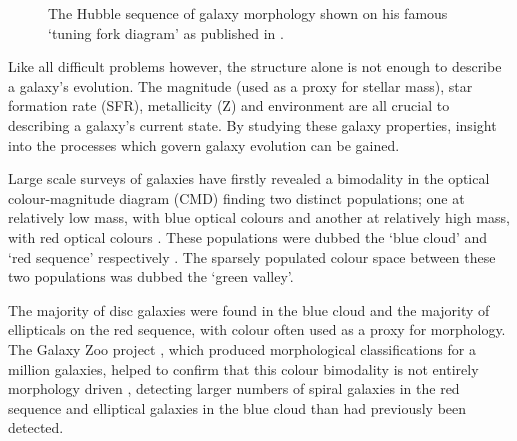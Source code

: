 \begin{figure}
\caption[The Hubble sequence for morphological classification of galaxies]{The Hubble sequence of galaxy morphology shown on his famous `tuning fork diagram' as published in \cite{hubble36}.}
\label{fig:hubble}
\end{figure}

Like all difficult problems however, the structure alone is not enough to describe a galaxy's evolution. The magnitude (used as a proxy for stellar mass), star formation rate (SFR), metallicity (Z) and environment are all crucial to describing a galaxy's current state. By studying these galaxy properties, insight into the processes which govern galaxy evolution can be gained.

Large scale surveys of galaxies have firstly revealed a bimodality in the optical colour-magnitude diagram (CMD) finding two distinct populations; one at relatively low mass, with blue optical colours and another at relatively high mass, with red optical colours \citep{Baldry04, Baldry06, Willmer06, ball08, Brammer09}. These populations were dubbed the `blue cloud' and `red sequence' respectively \citep{Chester64, bower92, Driver06, Faber07}.  The sparsely populated colour space between these two populations was dubbed the  `green valley'.

The majority of disc galaxies were found in the blue cloud and the majority of ellipticals on the red sequence, with colour often used as a proxy for morphology. The Galaxy Zoo project \citep{Lintott11}, which produced morphological classifications for a million galaxies, helped to confirm that this colour bimodality is not entirely morphology driven \citep{Strat01, Salim07, Sch07, CHV08, Bamford09, Skibba09}, detecting larger numbers of spiral galaxies in the red sequence \citep{masters10c} and elliptical galaxies in the blue cloud \citep{Sch09} than had previously been detected.

